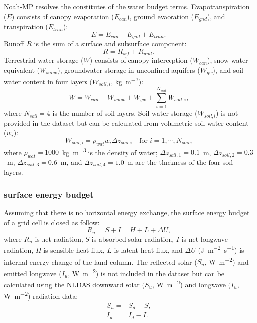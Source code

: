 \documentclass[essd]{copernicus}
\begin{document}
Noah-MP resolves the constitutes of the water budget terms. Evapotranspiration
($E$) consists of canopy evaporation ($E_{can}$), ground evaoration ($E_{gnd}$),
and transpiration ($E_{tran}$):
\begin{equation}
    E = E_{can} + E_{gnd} + E_{tran} \text{.}
\end{equation}
Runoff {$R$} is the sum of a surface and subsurface component:
\begin{equation}
    R = R_{srf} + R_{und} \text{.}
\end{equation}
Terrestrial water storage ($W$) consists of canopy interception ($W_{can}$),
snow water equivalent ($W_{snow}$), groundwater storage in unconfined aquifers
($W_{gw}$), and soil water content in four layers ($W_{soil,i}$,
\unit{kg~m^{-2}}):
\begin{equation}
    W = W_{can} + W_{snow} + W_{gw} + \sum_{i=1}^{N_{soil}} W_{soil,i} \text{,}
\end{equation}
where $N_{soil} = 4$ is the number of soil layers.
Soil water storage ($W_{soil,i}$) is not provided in the dataset but can be
calculated from volumetric soil water content ($w_{i}$):
\begin{equation}
    W_{soil,i} = \rho_{wat} w_i \Delta z_{soil,i}
    \quad \text{for} \; i = 1, \cdots, N_{soil}
    \text{,} \label{eq:soil-vmc}
\end{equation}
where $\rho_{wat}=1000$~\unit{kg~m^{-3}} is the density of water; $\Delta
z_{soil,1}=0.1$~\unit{m}, $\Delta z_{soil,2}=0.3$~\unit{m}, $\Delta
z_{soil,3}=0.6$~\unit{m}, and $\Delta z_{soil,4}=1.0$~\unit{m} are the thickness
of the four soil layers.


\subsubsection{surface energy budget}

Assuming that there is no horizontal energy exchange, the surface energy budget
of a grid cell is closed as follow:
\begin{equation}
    R_n = S + I = H + L + \Delta U \text{,} \label{eq:energy-balance}
\end{equation}
where $R_n$ is net radiation, $S$ is absorbed solar radiation, $I$ is net
longwave radiation, $H$ is sensible heat flux, $L$ is latent heat flux, and
$\Delta U$ (\unit{J~m^{-2}~s^{-1}}) is internal energy change of the land
column. The reflected solar ($S_u$, \unit{W~m^{-2}}) and emitted longwave
($I_u$, \unit{W~m^{-2}}) is not included in the dataset but can be calculated
using the NLDAS downward solar ($S_u$, \unit{W~m^{-2}}) and
longwave ($I_u$, \unit{W~m^{-2}}) radiation data:
\begin{align}
    S_u = & S_d - S \text{,} \\
    I_u = & I_d - I \text{.}
\end{align}
\end{document}
